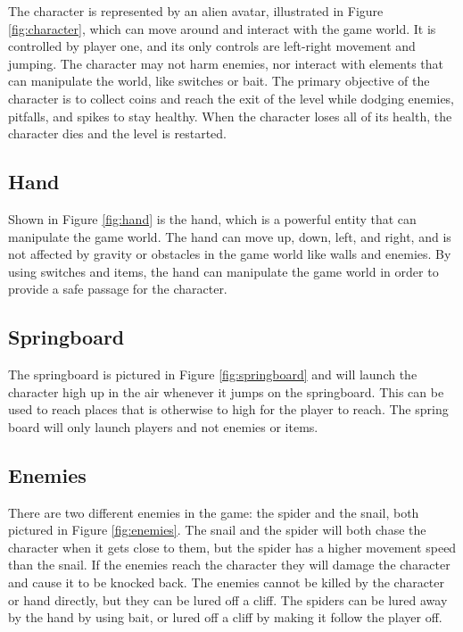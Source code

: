 The character is represented by an alien avatar, illustrated in Figure \ref{fig:character}, which can move around and interact with the game world. It is controlled by player one, and its only controls are left-right movement and jumping. The character may not harm enemies, nor interact with elements that can manipulate the world, like switches or bait. The primary objective of the character is to collect coins and reach the exit of the level while dodging enemies, pitfalls, and spikes to stay healthy. When the character loses all of its health, the character dies and the level is restarted.

\subsection{Hand}


Shown in Figure \ref{fig:hand} is the hand, which is a powerful entity that can manipulate the game world. The hand can move up, down, left, and right, and is not affected by gravity or obstacles in the game world like walls and enemies. By using switches and items, the hand can manipulate the game world in order to provide a safe passage for the character.

\subsection{Springboard}


The springboard is pictured in Figure \ref{fig:springboard} and will launch the character high up in the air whenever it jumps on the springboard. This can be used to reach places that is otherwise to high for the player to reach. The spring board will only launch players and not enemies or items.

\subsection{Enemies}


There are two different enemies in the game: the spider and the snail, both pictured in Figure \ref{fig:enemies}. The snail and the spider will both chase the character when it gets close to them, but the spider has a higher movement speed than the snail. If the enemies reach the character they will damage the character and cause it to be knocked back. The enemies cannot be killed by the character or hand directly, but they can be lured off a cliff. The spiders can be lured away by the hand by using bait, or lured off a cliff by making it follow the player off.


